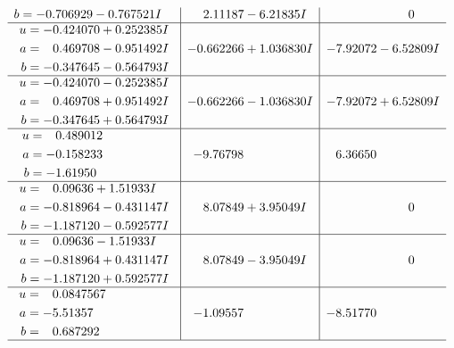 \documentclass[1p]{elsarticle_modified}
\theoremstyle{definition}
\begin{document}
$$\begin{array}{c|c|c}
\begin{aligned}
b &= -0.706929 - 0.767521 I\end{aligned}
 & \phantom{-}2.11187 - 6.21835 I & \phantom{-0.000000 } 0 \\ \hline\begin{aligned}
u &= -0.424070 + 0.252385 I \\
a &= \phantom{-}0.469708 - 0.951492 I \\
b &= -0.347645 - 0.564793 I\end{aligned}
 & -0.662266 + 1.036830 I & -7.92072 - 6.52809 I \\ \hline\begin{aligned}
u &= -0.424070 - 0.252385 I \\
a &= \phantom{-}0.469708 + 0.951492 I \\
b &= -0.347645 + 0.564793 I\end{aligned}
 & -0.662266 - 1.036830 I & -7.92072 + 6.52809 I \\ \hline\begin{aligned}
u &= \phantom{-}0.489012\phantom{ +0.000000I} \\
a &= -0.158233\phantom{ +0.000000I} \\
b &= -1.61950\phantom{ +0.000000I}\end{aligned}
 & -9.76798\phantom{ +0.000000I} & \phantom{-}6.36650\phantom{ +0.000000I} \\ \hline\begin{aligned}
u &= \phantom{-}0.09636 + 1.51933 I \\
a &= -0.818964 - 0.431147 I \\
b &= -1.187120 - 0.592577 I\end{aligned}
 & \phantom{-}8.07849 + 3.95049 I & \phantom{-0.000000 } 0 \\ \hline\begin{aligned}
u &= \phantom{-}0.09636 - 1.51933 I \\
a &= -0.818964 + 0.431147 I \\
b &= -1.187120 + 0.592577 I\end{aligned}
 & \phantom{-}8.07849 - 3.95049 I & \phantom{-0.000000 } 0 \\ \hline\begin{aligned}
u &= \phantom{-}0.0847567\phantom{ +0.000000I} \\
a &= -5.51357\phantom{ +0.000000I} \\
b &= \phantom{-}0.687292\phantom{ +0.000000I}\end{aligned}
 & -1.09557\phantom{ +0.000000I} & -8.51770\phantom{ +0.000000I}\\
 \hline 
 \end{array}$$\newpage\newpage\renewcommand{\arraystretch}{1}
\end{document}
